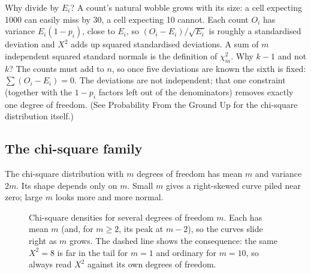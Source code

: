 \begin{whybox}
Why divide by $E_i$? A count's natural wobble grows with its size: a cell
expecting 1000 can easily miss by 30, a cell expecting 10 cannot. Each count
$O_i$ has variance $E_i(1-p_i)$, close to $E_i$, so $(O_i - E_i)/\sqrt{E_i}$ is
roughly a standardised deviation and $X^2$ adds up squared standardised
deviations. A sum of $m$ independent squared standard normals is the
definition of $\chi^2_m$. Why $k-1$ and not $k$? The counts must add to $n$,
so once five deviations are known the sixth is fixed: $\sum (O_i - E_i) = 0$.
The deviations are not independent; that one constraint (together with the
$1-p_i$ factors left out of the denominators) removes exactly one degree of
freedom. (See Probability From the Ground Up
for the chi-square distribution itself.)
\end{whybox}

\subsection{The chi-square family}

The chi-square distribution with $m$ degrees of freedom has mean $m$ and
variance $2m$. Its shape depends only on $m$. Small $m$ gives a right-skewed
curve piled near zero; large $m$ looks more and more normal.

\begin{figure}[H]
\centering
{}
\caption{Chi-square densities for several degrees of freedom $m$. Each has
mean $m$ (and, for $m \ge 2$, its peak at $m-2$), so the curves slide right as
$m$ grows. The dashed line shows the consequence: the same $X^2 = 8$ is far in
the tail for $m=1$ and ordinary for $m=10$, so always read $X^2$ against its own
degrees of freedom.}
\label{fig:cg-chisq-family}
\end{figure}

